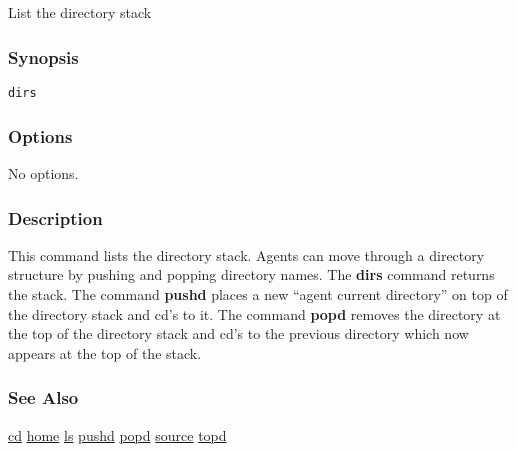 \subsection{}
\label{dirs}
List the directory stack 
\subsubsection*{Synopsis}
\begin{verbatim}
dirs
\end{verbatim}
\subsubsection*{Options}
 No options. 
\subsubsection*{Description}
 This command lists the directory stack. Agents can move through a directory structure by pushing and popping directory names. The \textbf{dirs}
 command returns the stack. 
 The command \textbf{pushd}
 places a new ``agent current directory'' on top of the directory stack and cd's to it. The command \textbf{popd}
 removes the directory at the top of the directory stack and cd's to the previous directory which now appears at the top of the stack. 
\subsubsection*{See Also}
\hyperref[cd]{cd} \hyperref[home]{home} \hyperref[ls]{ls} \hyperref[pushd]{pushd} \hyperref[popd]{popd} \hyperref[source]{source} \hyperref[topd]{topd} 